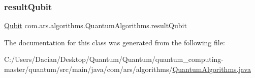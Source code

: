 \hypertarget{classcom_1_1ars_1_1algorithms_1_1_quantum_algorithms_ad04f21f877bc7d662c857a31ff07b65b}{}\label{classcom_1_1ars_1_1algorithms_1_1_quantum_algorithms_ad04f21f877bc7d662c857a31ff07b65b} 
\subsubsection{\texorpdfstring{result\+Qubit}{resultQubit}}
{\footnotesize\ttfamily \hyperlink{classcom_1_1ars_1_1qubits_1_1_qubit}{Qubit} com.\+ars.\+algorithms.\+Quantum\+Algorithms.\+result\+Qubit\hspace{0.3cm}{\ttfamily [protected]}}



The documentation for this class was generated from the following file\+:\begin{DoxyCompactItemize}
\item 
C\+:/\+Users/\+Dacian/\+Desktop/\+Quantum/\+Quantum/quantum\+\_\+computing-\/master/quantum/src/main/java/com/ars/algorithms/\hyperlink{_quantum_algorithms_8java}{Quantum\+Algorithms.\+java}\end{DoxyCompactItemize}
